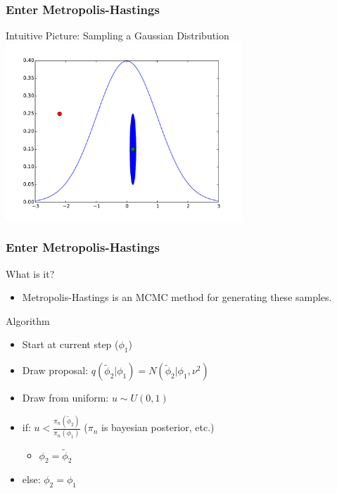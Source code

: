 \documentclass[mathserif]{beamer}
\begin{document}
\begin{frame}
\frametitle{Enter Metropolis-Hastings}

\begin{block}{Intuitive Picture: Sampling a Gaussian Distribution}
  \includegraphics[width=3.5in]{figs/norm-corr.pdf}
\end{block}

\end{frame}


\begin{frame}
\frametitle{Enter Metropolis-Hastings}

\begin{block}{What is it?}
  \begin{itemize}
  \item Metropolis-Hastings is an MCMC method for generating these samples. 
  \end{itemize}
\end{block}

\begin{block}{Algorithm}
  \begin{itemize}
  \item Start at current step ($\phi_1$)
  \item Draw proposal: $q(\tilde \phi_2 | \phi_1) = N(\tilde \phi_2 | \phi_1, \nu^2)$
  \item Draw from uniform: $u \sim U(0,1)$
  \item if: $u < \frac{\pi_n(\tilde \phi_2)}{\pi_n(\phi_1)}$ ($\pi_n$ is bayesian posterior, etc.)
    \begin{itemize}
    \item $\phi_2 = \tilde \phi_2$
    \end{itemize}
  \item else: $\phi_2 = \phi_1$
  \end{itemize}
\end{block}

\end{frame}
\end{document}
